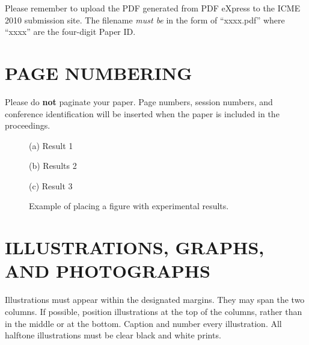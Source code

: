 \documentclass{article}
\begin{document}
Please remember to upload the PDF generated from PDF eXpress to the
ICME 2010 submission site. The filename \emph{must be} in the form
of ``xxxx.pdf'' where ``xxxx'' are the four-digit Paper ID.


\section{PAGE NUMBERING}
\label{sec:page}

Please do {\bf not} paginate your paper.  Page numbers, session numbers, and
conference identification will be inserted when the paper is included in the
proceedings.

%
\begin{figure}[t]
\begin{minipage}[b]{1.0\linewidth}
  \centering
  \vspace{2.0cm}
  \centerline{(a) Result 1}\medskip
\end{minipage}
%
\begin{minipage}[b]{.48\linewidth}
  \centering
  \vspace{1.5cm}
  \centerline{(b) Results 2}\medskip
\end{minipage}
\hfill
\begin{minipage}[b]{0.48\linewidth}
  \centering
  \vspace{1.5cm}
  \centerline{(c) Result 3}\medskip
\end{minipage}
%
\caption{Example of placing a figure with experimental results.}
\label{fig:res}
\end{figure}

\section{ILLUSTRATIONS, GRAPHS, AND PHOTOGRAPHS}
\label{sec:illust}

Illustrations must appear within the designated margins.  They may
span the two columns.  If possible, position illustrations at the
top of the columns, rather than in the middle or at the bottom.
Caption and number every illustration. All halftone illustrations
must be clear black and white prints.
\end{document}
